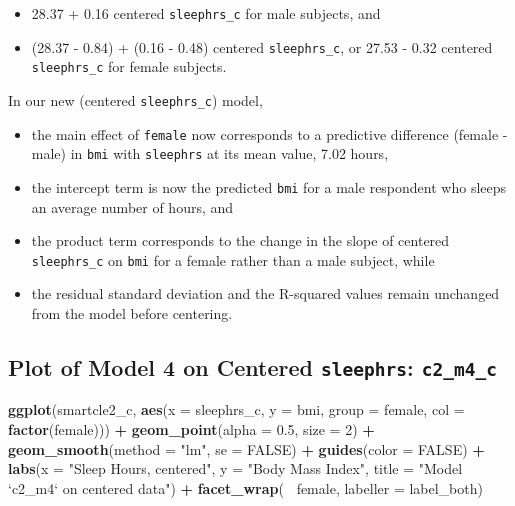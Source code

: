\documentclass[]{book}
\newenvironment{Shaded}{\begin{snugshade}}{\end{snugshade}}
\newcommand{\KeywordTok}[1]{\textcolor[rgb]{0.13,0.29,0.53}{\textbf{#1}}}
\newcommand{\DataTypeTok}[1]{\textcolor[rgb]{0.13,0.29,0.53}{#1}}
\newcommand{\DecValTok}[1]{\textcolor[rgb]{0.00,0.00,0.81}{#1}}
\newcommand{\FloatTok}[1]{\textcolor[rgb]{0.00,0.00,0.81}{#1}}
\newcommand{\StringTok}[1]{\textcolor[rgb]{0.31,0.60,0.02}{#1}}
\newcommand{\OtherTok}[1]{\textcolor[rgb]{0.56,0.35,0.01}{#1}}
\newcommand{\OperatorTok}[1]{\textcolor[rgb]{0.81,0.36,0.00}{\textbf{#1}}}
\newcommand{\NormalTok}[1]{#1}
\providecommand{\tightlist}{%
  \setlength{\itemsep}{0pt}\setlength{\parskip}{0pt}}
\theoremstyle{definition}
\theoremstyle{definition}
\theoremstyle{definition}
\theoremstyle{remark}
\begin{document}
\begin{itemize}
\tightlist
\item
  28.37 + 0.16 centered \texttt{sleephrs\_c} for male subjects, and
\item
  (28.37 - 0.84) + (0.16 - 0.48) centered \texttt{sleephrs\_c}, or 27.53
  - 0.32 centered \texttt{sleephrs\_c} for female subjects.
\end{itemize}

In our new (centered \texttt{sleephrs\_c}) model,

\begin{itemize}
\tightlist
\item
  the main effect of \texttt{female} now corresponds to a predictive
  difference (female - male) in \texttt{bmi} with \texttt{sleephrs} at
  its mean value, 7.02 hours,
\item
  the intercept term is now the predicted \texttt{bmi} for a male
  respondent who sleeps an average number of hours, and
\item
  the product term corresponds to the change in the slope of centered
  \texttt{sleephrs\_c} on \texttt{bmi} for a female rather than a male
  subject, while
\item
  the residual standard deviation and the R-squared values remain
  unchanged from the model before centering.
\end{itemize}

\subsection{\texorpdfstring{Plot of Model 4 on Centered
\texttt{sleephrs}:
\texttt{c2\_m4\_c}}{Plot of Model 4 on Centered sleephrs: c2\_m4\_c}}\label{plot-of-model-4-on-centered-sleephrs-c2_m4_c}

\begin{Shaded}
\begin{Highlighting}[]
\KeywordTok{ggplot}\NormalTok{(smartcle2_c, }\KeywordTok{aes}\NormalTok{(}\DataTypeTok{x =}\NormalTok{ sleephrs_c, }\DataTypeTok{y =}\NormalTok{ bmi, }\DataTypeTok{group =}\NormalTok{ female, }\DataTypeTok{col =} \KeywordTok{factor}\NormalTok{(female))) }\OperatorTok{+}
\StringTok{    }\KeywordTok{geom_point}\NormalTok{(}\DataTypeTok{alpha =} \FloatTok{0.5}\NormalTok{, }\DataTypeTok{size =} \DecValTok{2}\NormalTok{) }\OperatorTok{+}
\StringTok{    }\KeywordTok{geom_smooth}\NormalTok{(}\DataTypeTok{method =} \StringTok{"lm"}\NormalTok{, }\DataTypeTok{se =} \OtherTok{FALSE}\NormalTok{) }\OperatorTok{+}
\StringTok{    }\KeywordTok{guides}\NormalTok{(}\DataTypeTok{color =} \OtherTok{FALSE}\NormalTok{) }\OperatorTok{+}
\StringTok{    }\KeywordTok{labs}\NormalTok{(}\DataTypeTok{x =} \StringTok{"Sleep Hours, centered"}\NormalTok{, }\DataTypeTok{y =} \StringTok{"Body Mass Index"}\NormalTok{,}
         \DataTypeTok{title =} \StringTok{"Model `c2_m4` on centered data"}\NormalTok{) }\OperatorTok{+}
\StringTok{    }\KeywordTok{facet_wrap}\NormalTok{(}\OperatorTok{~}\StringTok{ }\NormalTok{female, }\DataTypeTok{labeller =}\NormalTok{ label_both)}
\end{Highlighting}
\end{Shaded}
\end{document}
